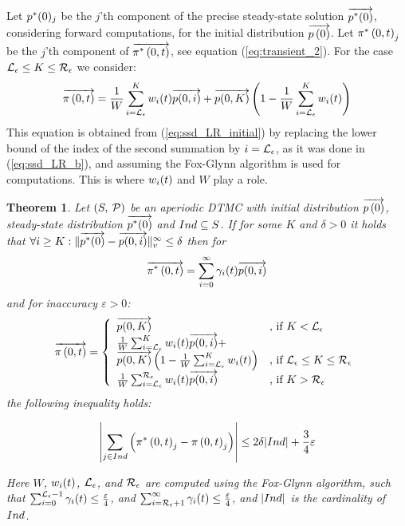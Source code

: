 \documentclass[times, 10pt,twocolumn]{article}
\newtheorem{theorem}{Theorem}
\begin{document}
		Let $p^{*}(0)_{j}$ be the $j$'th component of the precise steady-state solution $\overrightarrow{p^{*}(0)}$, considering forward computations, for the initial distribution $\overrightarrow{p \left( 0 \right)}$.  
		Let $\pi^{*} \left(0, t \right )_{j}$ be the $j$'th component of $\overrightarrow{\pi^{*} \left(0, t \right )}$, see equation (\ref{eq:transient_2}). For the case $\mathcal{L}_{\epsilon} \leq K \leq \mathcal{R}_{\epsilon}$ we consider:
		{\small
		\[
			\overrightarrow{\pi \left(0, t \right )} = \frac{1}{W} \sum_{i=\mathcal{L}_{\epsilon}}^{K}w_{i}(t) \overrightarrow{p(0,i)} + \overrightarrow{p(0,K)} \left(1- \frac{1}{W} \sum_{i=\mathcal{L}_{\epsilon}}^{K}w_{i}(t) \right)
		\]
		}
		This equation is obtained from (\ref{eq:ssd_LR_initial}) by replacing the lower bound of the index of the second summation by $i=\mathcal{L}_{\epsilon}$, as it was done in (\ref{eq:ssd_LR_b}), and assuming the Fox-Glynn algorithm is used for computations. This is where $w_{i}(t)$ and $W$ play a role.
			
		\begin{theorem}
			Let $\left( S,\: \mathcal{P} \right)$ be an aperiodic DTMC with initial distribution $\overrightarrow{p \left( 0 \right)}$, steady-state distribution $\overrightarrow{p^{*}(0)}$ and $Ind \subseteq S$. If for some $K$ and $\delta > 0$ it holds that $\forall i \geq K : \lVert  \overrightarrow{p^{*}(0)} - \overrightarrow{p(0,i)}  \rVert_{v}^{\infty} \leq \delta$ then for 
			{\small
			\[
				\overrightarrow{\pi^{*} \left(0, t \right )} = \sum_{i=0}^{\infty}\gamma_{i}(t) \overrightarrow{p(0,i)}
			\]
			}
			and for inaccuracy $\varepsilon > 0$:
			{\small
			\begin{equation}
				\displaystyle
				\overrightarrow{\pi \left(0, t \right )} = \left\{
				\begin{array}{ll}
					\overrightarrow{p(0,K)} & \text{, if } K < \mathcal{L}_{\epsilon}\\
					\frac{1}{W} \sum_{i=\mathcal{L}_{\epsilon}}^{K}w_{i}(t) \overrightarrow{p(0,i)} + & \\
					\overrightarrow{p(0,K)} \left(1- \frac{1}{W} \sum_{i=\mathcal{L}_{\epsilon}}^{K}w_{i}(t) \right) & \text{, if } \mathcal{L}_{\epsilon} \leq K \leq \mathcal{R}_{\epsilon}\\
					\frac{1}{W} \sum_{i=\mathcal{L}_{\epsilon}}^{\mathcal{R}_{\epsilon}}w_{i}(t) \overrightarrow{p(0,i)} & \text{, if } K > \mathcal{R}_{\epsilon}\\
				\end{array}
				\right .
				\nonumber
			\end{equation}
			}
			the following inequality holds:
			{\small
			\begin{fframe}{0.85}{-0.3}
				\[
					\left| \sum_{j \in Ind} \left( \pi^{*} \left(0, t \right )_{j} - \pi \left(0, t \right )_{j} \right) \right| \leq 2 \delta |Ind| + \frac{3}{4} \varepsilon
				\]
			\end{fframe}
			}
			Here $W$, $w_{i}(t)$, $\mathcal{L}_{\epsilon}$, and $\mathcal{R}_{\epsilon}$ are computed using the Fox-Glynn algorithm, such that $\sum_{i=0}^{\mathcal{L}_{\epsilon}-1} \gamma_{i}(t) \leq \frac{\varepsilon}{4}$, and $\sum_{i=\mathcal{R}_{\epsilon}+1}^{\infty} \gamma_{i}(t) \leq \frac{\varepsilon}{4}$, and $| Ind |$ is the cardinality of $Ind$.
			\label{th:error_fwd}
		\end{theorem}
\end{document}
